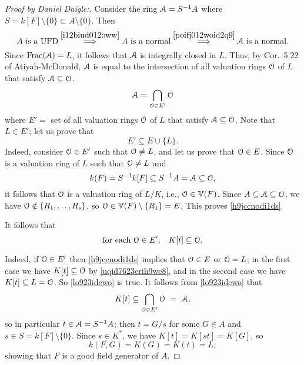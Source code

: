 \begin{proof}[Proof by Daniel Daigle:]
	Consider the ring $\EuScript{A} = S^{-1}A$ where $S =  k[F] \setminus \{0\} \subset A \setminus \{0\}$. 
	Then
	$$
	\text{$A$ is a UFD} \overset{\ref{i12biud012oww}}{\implies} \text{$A$ is a normal}
	\overset{\ref{poifj012woid2q9}}{\implies} \text{$\EuScript{A}$ is a normal} .
	$$
	Since $\operatorname{{\rm Frac}}( \EuScript{A} ) = L$, it follows that $\EuScript{A}$ is integrally closed in $L$. Thus, 
	by Cor.~5.22 of Atiyah-McDonald,
	$\EuScript{A}$ is equal to the intersection of all valuation rings $\EuScript{O}$ 
	of $L$ that satisfy $\EuScript{A} \subseteq \EuScript{O}$.
	\begin{equation} \label {bcdkoi23w9eje}
		\EuScript{A} = \bigcap_{\EuScript{O} \in E'} \EuScript{O}
	\end{equation}
	where $E'=$ set of all valuation rings $\EuScript{O}$ of $L$ that satisfy $\EuScript{A} \subseteq \EuScript{O}$.
	Note that $L \in E'$; let us prove that 
	\begin{equation} \label {h9jccnodi1ds}
		E' \subseteq E \cup \{ L \} .
	\end{equation}
	Indeed, consider $\EuScript{O} \in E'$ such that $\EuScript{O} \neq L$, and let us prove that  $\EuScript{O}  \in E$.
	Since $\EuScript{O}$ is a valuation ring of $L$ such that $\EuScript{O} \neq L$ and
	$$
	 k(F) = S^{-1}  k[F] \subseteq S^{-1}A = \EuScript{A} \subseteq \EuScript{O},
	$$ 
	it follows that $\EuScript{O}$ is a valuation ring of $L/K$, i.e., $\EuScript{O} \in \mathbb{V}(F)$. Since
	$A \subseteq \EuScript{A} \subseteq \EuScript{O}$, we have $\EuScript{O} \notin \{ R_1, \dots, R_s \}$,
	so $\EuScript{O} \in \mathbb{V}(F) \setminus \{R_1\} = E$. This proves \eqref{h9jccnodi1ds}.

	It follows that
	\begin{equation} \label {lo923idewo}
		\text{for each $\EuScript{O} \in E'$,\quad  $K[t] \subseteq \EuScript{O}$.}
	\end{equation}

	Indeed, if $\EuScript{O} \in E'$ then \eqref{h9jccnodi1ds} implies that $\EuScript{O} \in E$ or $\EuScript{O}=L$;
	in the first case we have $K[t] \subseteq \EuScript{O}$ by \eqref{uqid7623erih9we8},
	and in the second case we have $K[t] \subseteq L = \EuScript{O}$. So \eqref{lo923idewo} is true.
	It follows from \eqref{lo923idewo} that
	$$
	K[t] \subseteq \bigcap_{\Oeul \in E'} \Oeul\ =\ \Aeul,
	$$
	so in particular $t \in \EuScript{A} = S^{-1}A$; then $t = G/s$ for 
	some $G \in A$ and $s \in S =  k[F] \setminus \{0\}$.
	Since $s \in K^*$, we have $K[t] = K[st] = K[G]$, so 
	$$
	 k(F,G) = K(G) = K(t) = L,
	$$
	showing that $F$ is a good field generator of $A$.
\end{proof}




